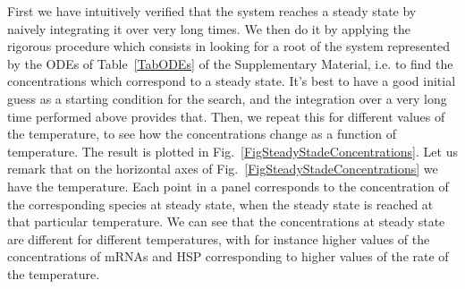 \documentclass[oneside, 10pt, a4paper, twocolumn]{article}
\begin{document}
First we have intuitively verified that the system reaches a steady state by naively integrating it over very long times. %
We then do it by applying the rigorous procedure which consists in looking for a root of the system 
represented by the ODEs of Table~\ref{TabODEs} of the Supplementary Material, i.e. 
to find the concentrations which correspond to a steady state. 
It's best to have a good initial guess as a starting condition for the search, and the integration over a very long time performed above provides that. 
Then, we repeat this for different values of the temperature, to see how the concentrations change as a function of temperature. The result is plotted in Fig.~\ref{FigSteadyStadeConcentrations}. Let us remark that on the horizontal axes of Fig.~\ref{FigSteadyStadeConcentrations} we have the temperature. Each point in a panel corresponds to the concentration of the corresponding species at steady state, when the steady state is reached at that particular temperature. 
We can see that the concentrations at steady state are different for different temperatures, with for instance higher values of the concentrations of mRNAs and HSP corresponding to higher values of the rate of the temperature. 
\end{document}
